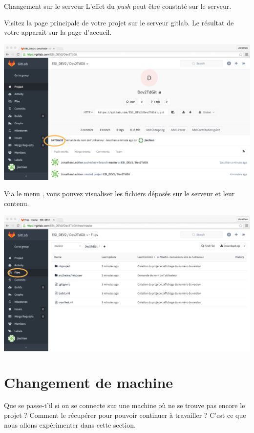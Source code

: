 \documentclass[a4paper,11pt]{style-esi/td}
\begin{document}
\begin{Tutoriel}{Changement sur le serveur}
	L'effet du \emph{push} peut être constaté sur le serveur.
	\begin{steps}
	\item
		Visitez la page principale de votre projet sur le serveur gitlab.
		Le résultat de votre  apparait sur la page d'accueil.
		\begin{center}
			\includegraphics[width=.7\textwidth]{image/NetBeans_Push09.png}
		\end{center}
	\item 
		Via le menu , 
		vous pouvez visualiser les fichiers déposés sur le serveur
		et leur contenu.
		\begin{center}
			\includegraphics[width=.7\textwidth]{image/NetBeans_Push10.png}
		\end{center}
	\end{steps}
\end{Tutoriel}

\newpage
\section{Changement de machine}

Que se passe-t'il si on se connecte sur une machine 
où ne se trouve pas encore le projet ?
Comment le récupérer pour pouvoir continuer à travailler ?
C'est ce que nous allons expérimenter dans cette section.
\end{document}
